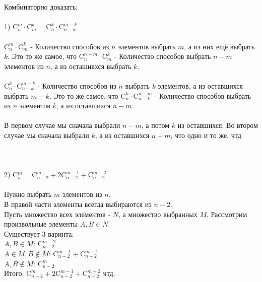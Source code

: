 \documentclass{article}
\begin{document}
\section{}
Комбинаторно доказать:\\\\
1) $\text{C}^m_n\cdot\text{C}^k_m = \text{C}^k_n\cdot\text{C}^{m-k}_{n-k}$\\\\ $\text{C}^m_n\cdot\text{C}^k_m$ - Количество способов из $n$ элементов выбрать $m$, а из них ещё выбрать $k$. Это то же самое, что $\text{C}^{n-m}_n\cdot\text{C}^{k}_{m}$ - Количество способов выбрать $n-m$ элементов из $n$, а из осташивхся выбрать $k$.\\\\
$\text{C}^k_n\cdot\text{C}^{m-k}_{n-k}$ - Количество способов из $n$ выбрать $k$ элементов, а из оставшихся выбрать $m-k$. Это то же самое, что $\text{C}^k_n\cdot\text{C}^{n-m}_{n-k}$ - Количество способов выбрать из $n$ элементов $k$, а из оставшихся $n-m$\\\\
В первом случае мы сначала выбрали $n-m$, а потом $k$ из оставшихся. Во втором случае мы сначала выбрали $k$, а из оставшихся $n-m$, что одно и то же. чтд\\\\\\\\
2) C$^m_n=\text{C}^{m}_{n-2}+2\text{C}^{m-1}_{n-2}+\text{C}^{m-2}_{n-2}$
\\\\Нужно выбрать $m$ элементов из $n$.
\\
В правой части элементы всегда выбираются из $n-2$.\\
Пусть множество всех элементов - $N$, а множество выбранных $M$.
Рассмотрим произвольные элементы $A,B\in N$.\\
Существует 3 варинта:\\
$A,B\in M$: $\text{C}^{m-2}_{n-2}$\\
$A \in M, B \notin M$: $\text{C}^{m-1}_{n-2}+\text{C}^{m-1}_{n-2}$\\
$A, B \notin M$: $\text{C}^{m}_{n-2}$\\
Итого: $\text{C}^{m}_{n-2}+2\text{C}^{m-1}_{n-2}+\text{C}^{m-2}_{n-2}$ чтд.
\end{document}
